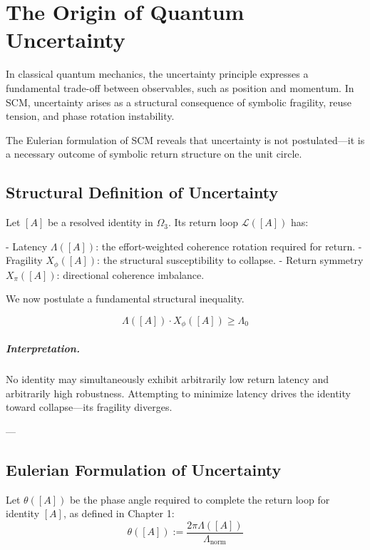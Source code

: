 \chapter{The Origin of Quantum Uncertainty} \label{chapter:uncertainty}

In classical quantum mechanics, the uncertainty principle expresses a fundamental trade-off between observables, such as position and momentum. In SCM, uncertainty arises as a structural consequence of symbolic fragility, reuse tension, and phase rotation instability.

The Eulerian formulation of SCM reveals that uncertainty is not postulated—it is a necessary outcome of symbolic return structure on the unit circle.

\section{Structural Definition of Uncertainty}

Let $[A]$ be a resolved identity in $\Omega_3$. Its return loop $\mathcal{L}([A])$ has:

- Latency $\Lambda([A])$: the effort-weighted coherence rotation required for return.
- Fragility $X_\phi([A])$: the structural susceptibility to collapse.
- Return symmetry $X_\pi([A])$: directional coherence imbalance.

We now postulate a fundamental structural inequality.

\begin{proposition}
\label{prop:scm-uncertainty}
\[
\Lambda([A]) \cdot X_\phi([A]) \geq \Lambda_0
\]
\end{proposition}

\paragraph{Interpretation.}  
No identity may simultaneously exhibit arbitrarily low return latency and arbitrarily high robustness. Attempting to minimize latency drives the identity toward collapse—its fragility diverges.

---

\section{Eulerian Formulation of Uncertainty}

Let $\theta([A])$ be the phase angle required to complete the return loop for identity $[A]$, as defined in Chapter 1:
\[
\theta([A]) := \frac{2\pi \Lambda([A])}{\Lambda_{\text{norm}}}
\]

